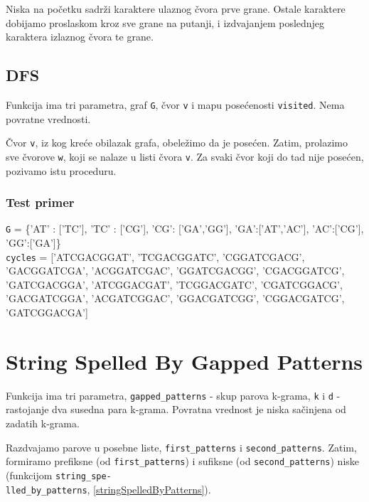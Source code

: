 Niska na početku sadrži karaktere ulaznog čvora prve grane. Ostale karaktere dobijamo proslaskom kroz sve grane na putanji, i izdvajanjem poslednjeg karaktera izlaznog čvora te grane.





\subsection{DFS}
\label{DFS}

Funkcija ima tri parametra, graf \texttt{G}, čvor \texttt{v} i mapu posećenosti \texttt{visited}. Nema povratne vrednosti.

Čvor \texttt{v}, iz kog kreće obilazak grafa, obeležimo da je posećen. Zatim, prolazimo sve čvorove \texttt{w}, koji se nalaze u listi čvora \texttt{v}. Za svaki čvor koji do tad nije posećen, pozivamo istu proceduru.





\subsubsection{Test primer}

\noindent\texttt{G} = \{'AT' : ['TC'], 'TC' : ['CG'], 'CG': ['GA','GG'], 'GA':['AT','AC'],  'AC':['CG'], 'GG':['GA']\}
\\\texttt{cycles} = ['ATCGACGGAT', 'TCGACGGATC', 'CGGATCGACG', 'GACGGATCGA', 'ACGGATCGAC', 'GGATCGACGG', 'CGACGGATCG', 'GATCGACGGA', 'ATCGGACGAT', 'TCGGACGATC', 'CGATCGGACG', 'GACGATCGGA', 'ACGATCGGAC', 'GGACGATCGG', 'CGGACGATCG', 'GATCGGACGA']

\section{String Spelled By Gapped Patterns}
\label{stringSpelledByGappedPatterns}

Funkcija ima tri parametra, \texttt{gapped\_patterns} - skup parova k-grama, \texttt{k} i \texttt{d} - rastojanje dva susedna para k-grama. Povratna vrednost je niska sačinjena od zadatih k-grama.

Razdvajamo parove u posebne liste, \texttt{first\_patterns} i \texttt{second\_patterns}. Zatim, formiramo prefiksne (od \texttt{first\_patterns}) i sufiksne (od \texttt{second\_patterns}) niske (funkcijom \texttt{string\_spe-\\lled\_by\_patterns}, \ref{stringSpelledByPatterns}).


